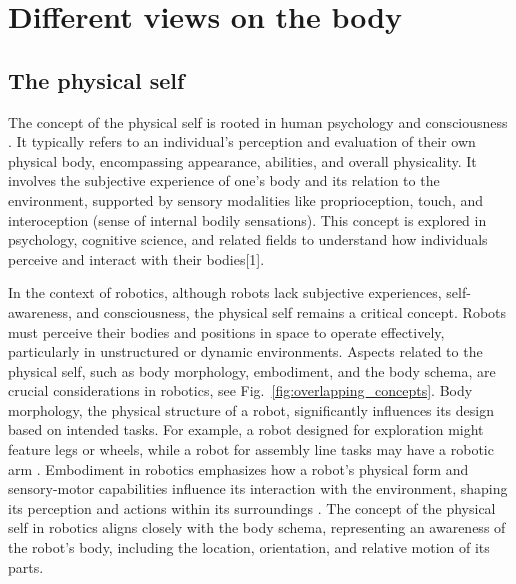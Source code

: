 \section{Different views on the body}


\subsection{The physical self}
The concept of the physical self is rooted in human psychology and consciousness \cite{Tsakiris2016multisensorybasisself,Overgaard2023selfitsbody}. It typically refers to an individual's perception and evaluation of their own physical body, encompassing appearance, abilities, and overall physicality. It involves the subjective experience of one's body and its relation to the environment, supported by sensory modalities like proprioception, touch, and interoception (sense of internal bodily sensations). This concept is explored in psychology, cognitive science, and related fields to understand how individuals perceive and interact with their bodies[1].

In the context of robotics, although robots lack subjective experiences, self-awareness, and consciousness, the physical self remains a critical concept. Robots must perceive their bodies and positions in space to operate effectively, particularly in unstructured or dynamic environments. Aspects related to the physical self, such as body morphology, embodiment, and the body schema, are crucial considerations in robotics, see Fig.~\ref{fig:overlapping_concepts}. Body morphology, the physical structure of a robot, significantly influences its design based on intended tasks. For example, a robot designed for exploration might feature legs or wheels, while a robot for assembly line tasks may have a robotic arm \cite{Miller2018EmbodimentSituatednessMorphology}. Embodiment in robotics emphasizes how a robot's physical form and sensory-motor capabilities influence its interaction with the environment, shaping its perception and actions within its surroundings \cite{Wainer2006rolephysicalembodiment}. The concept of the physical self in robotics aligns closely with the body schema, representing an awareness of the robot's body, including the location, orientation, and relative motion of its parts.

